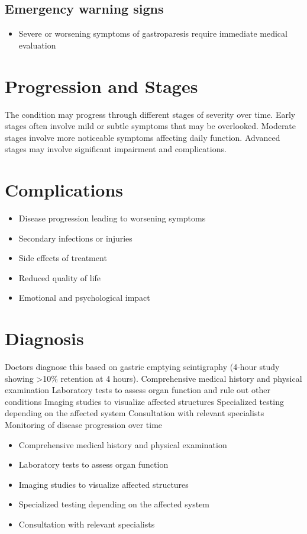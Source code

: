\subsection{Emergency warning signs}
\begin{itemize}[noitemsep]
  \item Severe or worsening symptoms of gastroparesis require immediate medical evaluation
\end{itemize}
\section{Progression and Stages}
The condition may progress through different stages of severity over time. Early stages often involve mild or subtle symptoms that may be overlooked. Moderate stages involve more noticeable symptoms affecting daily function. Advanced stages may involve significant impairment and complications.
\section{Complications}
\begin{itemize}[noitemsep]
  \item Disease progression leading to worsening symptoms
  \item Secondary infections or injuries
  \item Side effects of treatment
  \item Reduced quality of life
  \item Emotional and psychological impact
\end{itemize}
\section{Diagnosis}
Doctors diagnose this based on gastric emptying scintigraphy (4-hour study showing >10\% retention at 4 hours). Comprehensive medical history and physical examination Laboratory tests to assess organ function and rule out other conditions Imaging studies to visualize affected structures Specialized testing depending on the affected system Consultation with relevant specialists Monitoring of disease progression over time

\begin{itemize}[noitemsep]
  \item Comprehensive medical history and physical examination
  \item Laboratory tests to assess organ function
  \item Imaging studies to visualize affected structures
  \item Specialized testing depending on the affected system
  \item Consultation with relevant specialists
\end{itemize}
